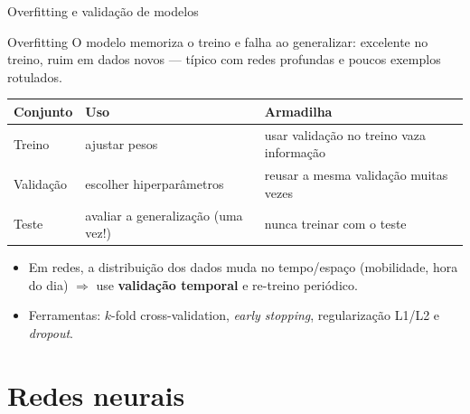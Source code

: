 \documentclass[aspectratio=169,11pt]{beamer}
\begin{document}
\begin{frame}{Overfitting e validação de modelos}
  \begin{block}{Overfitting}
    O modelo memoriza o treino e falha ao generalizar: excelente no treino, ruim em dados novos --- típico com redes profundas e poucos exemplos rotulados.
  \end{block}
  \begin{center}
    \scriptsize
    \begin{tabular}{@{}lll@{}}
      \toprule
      \textbf{Conjunto} & \textbf{Uso} & \textbf{Armadilha}\\
      \midrule
      Treino & ajustar pesos & usar validação no treino vaza informação\\
      Validação & escolher hiperparâmetros & reusar a mesma validação muitas vezes\\
      Teste & avaliar a generalização (uma vez!) & nunca treinar com o teste\\
      \bottomrule
    \end{tabular}
  \end{center}
  \begin{itemize}
    \item Em redes, a distribuição dos dados muda no tempo/espaço (mobilidade, hora do dia) $\Rightarrow$ use \textbf{validação temporal} e re-treino periódico.
    \item Ferramentas: $k$-fold cross-validation, \emph{early stopping}, regularização L1/L2 e \emph{dropout}.
  \end{itemize}
\end{frame}

\section{Redes neurais}
\end{document}
